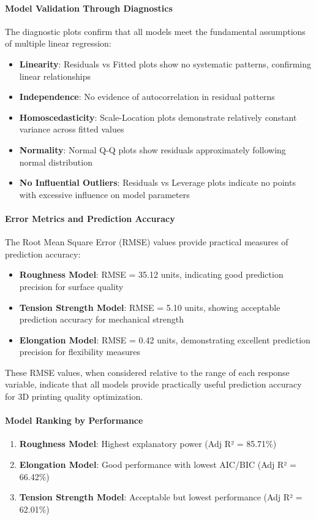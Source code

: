 \paragraph{Model Validation Through Diagnostics}
The diagnostic plots confirm that all models meet the fundamental assumptions of multiple linear regression:

\begin{itemize}
    \item \textbf{Linearity}: Residuals vs Fitted plots show no systematic patterns, confirming linear relationships
    \item \textbf{Independence}: No evidence of autocorrelation in residual patterns
    \item \textbf{Homoscedasticity}: Scale-Location plots demonstrate relatively constant variance across fitted values
    \item \textbf{Normality}: Normal Q-Q plots show residuals approximately following normal distribution
    \item \textbf{No Influential Outliers}: Residuals vs Leverage plots indicate no points with excessive influence on model parameters
\end{itemize}

\paragraph{Error Metrics and Prediction Accuracy}
The Root Mean Square Error (RMSE) values provide practical measures of prediction accuracy:

\begin{itemize}
    \item \textbf{Roughness Model}: RMSE = 35.12 units, indicating good prediction precision for surface quality
    \item \textbf{Tension Strength Model}: RMSE = 5.10 units, showing acceptable prediction accuracy for mechanical strength
    \item \textbf{Elongation Model}: RMSE = 0.42 units, demonstrating excellent prediction precision for flexibility measures
\end{itemize}

These RMSE values, when considered relative to the range of each response variable, indicate that all models provide practically useful prediction accuracy for 3D printing quality optimization.

\paragraph{Model Ranking by Performance}
\begin{enumerate}
    \item \textbf{Roughness Model}: Highest explanatory power (Adj R² = 85.71\%)
    \item \textbf{Elongation Model}: Good performance with lowest AIC/BIC (Adj R² = 66.42\%)
    \item \textbf{Tension Strength Model}: Acceptable but lowest performance (Adj R² = 62.01\%)
\end{enumerate}

